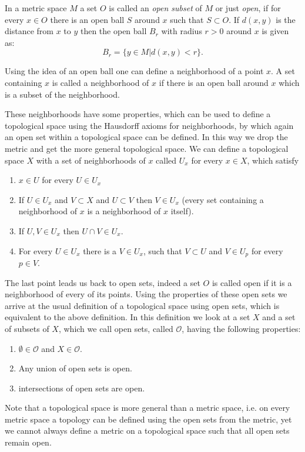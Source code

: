 \documentclass[12pt]{article}
\begin{document}
In a metric space $M$ a set $O$ is called an \emph{open subset} of $M$ or just \emph{open}, if for every $x\in O$ there is an open ball $S$ around $x$ such that $S\subset O$. If $d(x,y)$ is the distance from $x$ to $y$ then the open ball $B_r$ with radius $r>0$ around $x$ is given as:
$$B_r=\{y\in M|d(x,y)<r\}.$$

Using the idea of an open ball one can define a neighborhood of a point $x$. A set containing $x$ is called a neighborhood of $x$ if there is an open ball around $x$ which is a subset of the neighborhood.

These neighborhoods have some properties, which can be used to define a topological space using the Hausdorff axioms for neighborhoods, by which again an open set within a topological space can be defined. In this way we drop the metric and get the more general topological space. We can define a topological space $X$ with a set of neighborhoods of $x$ called $U_x$ for every $x\in X$, which satisfy
\begin{enumerate}
\item $x\in U$ for every $U\in U_x$
\item If $U\in U_x$ and $V\subset X$ and $U\subset V$ then $V\in U_x$ (every set containing a neighborhood of $x$ is a neighborhood of $x$ itself).
\item If $U,V\in U_x$ then $U\cap V\in U_x$.
\item For every $U\in U_x$ there is a $V\in U_x$, such that $V\subset U$ and $V\in U_p$ for every $p\in V$.
\end{enumerate}

The last point leads us back to open sets, indeed a set $O$ is called open if it is a neighborhood of every of its points. Using the properties of these open sets we arrive at the usual definition of a topological space using open sets, which is equivalent to the above definition. In this definition we look at a set $X$ and a set of subsets of $X$, which we call open sets, called $\mathcal{O}$, having the following properties:
\begin{enumerate}
\item $\emptyset\in\mathcal{O}$ and $X\in\mathcal{O}$.
\item Any union of open sets is open.
\item {} intersections of open sets are open.
\end{enumerate}

Note that a topological space is more general than a metric space, i.e. on every metric space a topology can be defined using the open sets from the metric, yet we cannot always define a metric on a topological space such that all open sets remain open.
\end{document}
